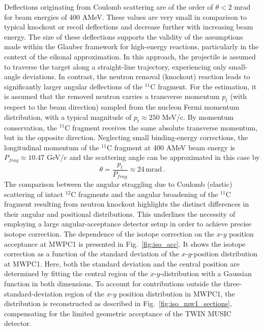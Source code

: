 %
Deflections originating from Coulomb scattering are of the order of $\theta < 2$ mrad for beam energies of 400 AMeV. These values are very small in comparison to typical knockout or recoil deflections and decrease further with increasing beam energy. The size of these deflections supports the validity of the assumptions made within the Glauber framework for high-energy reactions, particularly in the context of the eikonal approximation. In this approach, the projectile is assumed to traverse the target along a straight-line trajectory, experiencing only small-angle deviations.\newline
In contrast, the neutron removal (knockout) reaction leads to significantly larger angular deflections of the $^{11}$C fragment. For the estimation, it is assumed that the removed neutron carries a transverse momentum $p_{t}$ (with respect to the beam direction) sampled from the nucleon Fermi momentum distribution, with a typical magnitude of $p_t \approx 250$ MeV/c. By momentum conservation, the $^{11}$C fragment receives the same absolute transverse momentum, but in the opposite direction.
Neglecting small binding-energy corrections, the longitudinal momentum of the $^{11}$C fragment at 400 AMeV beam energy is $ P_{frag} \approx 10.47$ GeV/c and the scattering angle can be approximated in this case by
\begin{equation}
\theta  = \frac{p_t}{P_{frag}} \approx 24\, \mathrm{mrad} \, .
\end{equation}
%
The comparison between the angular straggling due to Coulomb (elastic) scattering of intact $^{12}$C fragments and the angular broadening of the $^{11}$C fragment resulting from neutron knockout highlights the distinct differences in their angular and positional distributions. This underlines the necessity of employing a large angular-acceptance detector setup in order to achieve precise isotope correction.\newline
The dependence of the isotope correction on the $x$-$y$ position acceptance at MWPC1 is presented in Fig.~\ref{fig:iso_acc}. It shows the isotope correction as a function of the standard deviation of the $x$-$y$-position distribution at MWPC1. Here, both the standard deviation and the central position are determined by fitting the central region of the $x$-$y$-distribution with a Gaussian function in both dimensions. To account for contributions outside the three-standard-deviation region of the $x$-$y$ position distribution in MWPC1, the distribution is reconstructed as described in Fig.~\ref{fig:iso_mw1_sections}, compensating for the limited geometric acceptance of the TWIN MUSIC detector.
